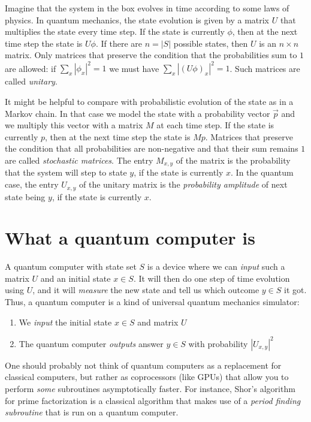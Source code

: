 Imagine that the system in the box evolves in time according to some laws of physics.
In quantum mechanics, the state evolution is given by a matrix $U$ that multiplies the state every time step.
If the state is currently $\phi$, then at the next time step the state is $U\phi$.
If there are $n = |S|$ possible states, then $U$ is an $n \times n$ matrix.
Only matrices that preserve the condition that the probabilities sum to $1$ are allowed: if $\sum_x |\phi_x|^2 = 1$ we must have $\sum_x |(U\phi)_x|^2 = 1$.
Such matrices are called \emph{unitary}.

It might be helpful to compare with probabilistic evolution of the state as in a Markov chain.
In that case we model the state with a probability vector $\vec{p}$ and we multiply this vector with a matrix $M$ at each time step.
If the state is currently $p$, then at the next time step the state is $Mp$.
Matrices that preserve the condition that all probabilities are non-negative and that their sum remains $1$ are called \emph{stochastic matrices}.
The entry $M_{x,y}$ of the matrix is the probability that the system will step to state $y$, if the state is currently $x$.
In the quantum case, the entry $U_{x,y}$ of the unitary matrix is the \emph{probability amplitude} of next state being $y$, if the state is currently $x$.

\section{What a quantum computer is}

A quantum computer with state set $S$ is a device where we can \emph{input} such a matrix $U$ and an initial state $x \in S$.
It will then do one step of time evolution using $U$, and it will \emph{measure} the new state and tell us which outcome $y \in S$ it got.
Thus, a quantum computer is a kind of universal quantum mechanics simulator:
\begin{enumerate}
  \item We \emph{input} the initial state $x \in S$ and matrix $U$
  \item The quantum computer \emph{outputs} answer $y \in S$ with probability $|U_{x,y}|^2$
\end{enumerate}

One should probably not think of quantum computers as a replacement for classical computers,
but rather as coprocessors (like GPUs) that allow you to perform \emph{some} subroutines asymptotically faster.
For instance, Shor's algorithm for prime factorization is a classical algorithm that makes use of a \emph{period finding subroutine} that is run on a quantum computer.

